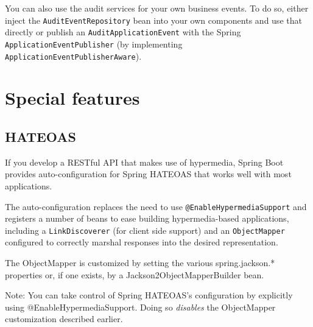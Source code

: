 \documentclass{scrartcl}
\begin{document}
You can also use the audit services for your own business events. To do so, either inject the \lstinline|AuditEventRepository| bean into your own components and use that directly or publish an \lstinline|AuditApplicationEvent| with the Spring \lstinline|ApplicationEventPublisher| (by implementing \lstinline|ApplicationEventPublisherAware|).

\section{Special features}

\subsection{HATEOAS}

If you develop a RESTful API that makes use of hypermedia, Spring Boot provides auto-configuration for Spring HATEOAS that works well with most applications.

The auto-configuration replaces the need to use \lstinline|@EnableHypermediaSupport| and registers a number of beans to ease building hypermedia-based applications, including a \lstinline|LinkDiscoverer| (for client side support) and an \lstinline|ObjectMapper| configured to correctly marshal responses into the desired representation.

The ObjectMapper is customized by setting the various spring.jackson.* properties or, if one exists, by a Jackson2ObjectMapperBuilder bean.

Note: You can take control of Spring HATEOAS’s configuration by explicitly using @EnableHypermediaSupport. Doing so \textit{disables} the ObjectMapper customization described earlier.
\end{document}

